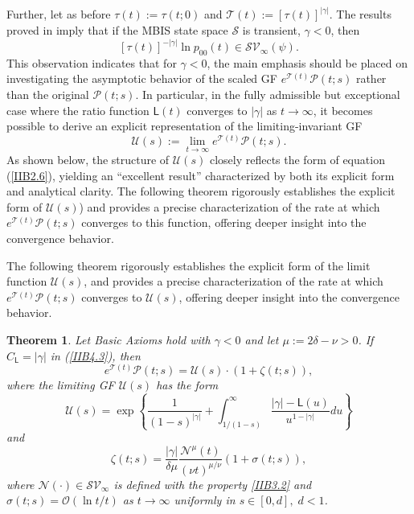 \documentclass[10pt,reqno]{amsart}
\newtheorem{theorem}{Theorem}
\theoremstyle{definition}
\numberwithin{equation}{section}
\begin{document}
    Further, let as before $\tau(t):=\tau(t;0)$ and $\mathcal{T}(t):={{[\tau(t)]}^{|\gamma|}}$. The results
    proved in {\cite{ImUfa21}} imply that if the MBIS state space $\mathcal{S}$ is transient, $\gamma<0$, then
\[
    {{[\tau(t)]}^{-|\gamma|}}\ln{{p}_{00}}(t)\in{{\mathcal{SV}}_{\infty}}(\psi ).
\]
    This observation indicates that for $\gamma<0$, the main emphasis should be placed on investigating the asymptotic
    behavior of the scaled GF ${e^{\mathcal{T}(t)}}\mathcal{P}(t;s)$ rather than the original $\mathcal{P}(t;s)$.
    In particular, in the fully admissible but exceptional case where the ratio function $\textsf{L}(t)$ converges
    to $|\gamma|$ as $t\to\infty$, it becomes possible to derive an explicit representation of the limiting-invariant GF
\[
    \mathcal{U}(s):=\lim_{t\to\infty}{{e}^{\mathcal{T}(t)}}\mathcal{P}(t;s).
\]
    As shown below, the structure of $\mathcal{U}(s)$ closely reflects the form of equation {(\ref{IIB2.6})}, yielding an
    ``excellent result'' characterized by both its explicit form and analytical clarity. The following theorem rigorously
    establishes the explicit form of $\mathcal{U}(s)$) and provides a precise characterization of the rate at which
    ${e^{\mathcal{T}(t)}}\mathcal{P}(t;s)$ converges to this function, offering deeper insight into the convergence behavior.

    The following theorem rigorously establishes the explicit form of the limit function $\mathcal{U}(s)$,
    and provides a precise characterization of the rate at which ${e^{\mathcal{T}(t)}}\mathcal{P}(t;s)$
    converges to $\mathcal{U}(s)$, offering deeper insight into the convergence behavior.

\begin{theorem}                      \label{IIBTh4}
    Let Basic Axioms hold with $\gamma<0$ and let $\mu:=2\delta-\nu>0$. If ${C_{\textsf{L}}}=|\gamma|$
    in {(\ref{IIB4.3})}, then
\begin{equation}                \label{IIB4.4}
    {{e}^{\mathcal{T}(t)}}\mathcal{P}(t;s)=\mathcal{U}(s)\cdot\left(1+\zeta(t;s)\right),
\end{equation}
    where the limiting GF $\mathcal{U}(s)$ has the form
\begin{equation}                \label{IIB4.5}
    \mathcal{U}(s)=\exp\left\{\frac{1}{{(1-s)}^{|\gamma|}}+
    \int_{{1}/{(1-s)}}^{\infty}{\frac{|\gamma|-\textsf{L}(u)}{{u^{1-|\gamma|}}}du}\right\}
\end{equation}
    and
\[
    \zeta(t;s)=\frac{|\gamma|}{\delta\mu}\frac{{{\mathcal{N}}^{\mu}}(t)}{{(\nu{t})}^{{\mu}/{\nu}}}\left(1+\sigma(t;s)\right),
\]
    where $\mathcal{N}(\cdot)\in{{\mathcal{SV}}_{\infty}}$ is defined with the property {\eqref{IIB3.2}}
    and $\sigma(t;s)=\mathcal{O}\left({\ln{t}}/{t}\right)$ as $t\to\infty$ uniformly in $s\in[0,d],\;d<1$.
\end{theorem}
\end{document}
